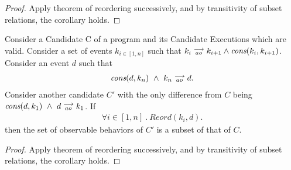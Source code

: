 \begin{proof}
    Apply theorem of reordering successively, and by transitivity of subset relations, the corollary holds.
\end{proof}

\begin{corollary}
    \label{CorollCodeMotion2}
    Consider a Candidate C of a program and its Candidate Executions which are valid.
    Consider a set of events $k_{i \in[1,n]}$ such that $k_i\stackrel{\longrightarrow}{_{ao}}k_{i+1} \wedge \textit{cons}(k_i,k_{i+1})$.
    Consider an event $d$ such that 
    \begin{align*}
        \textit{cons}(d,k_n) \ \wedge \ k_n\stackrel{\longrightarrow}{_{ao}}d.  
    \end{align*}
    Consider another candidate $C'$ with the only difference from $C$ being $\cons{d}{k_1} \ \wedge \ \reln{d}{ao}{k_1}$.
    If 
    \begin{align*}
        \forall i \in [1,n] \ . \ Reord(k_i,d).
    \end{align*} 
    then the set of observable behaviors of $C'$ is a subset of that of $C$. 
\end{corollary}

\begin{proof}
    Apply theorem of reordering successively, and by transitivity of subset relations, the corollary holds.
\end{proof}